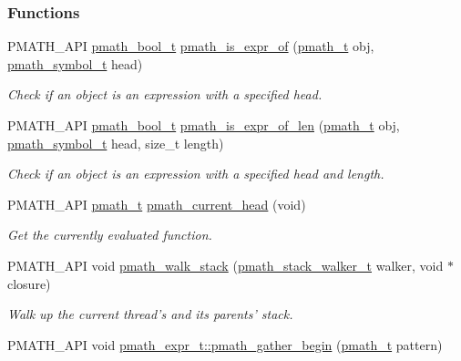 \subsubsection*{Functions}
\begin{CompactItemize}
\item 
PMATH\_\-API \hyperlink{group__general__types_gc92090cb0b56345d6c379ed2341d4ef4}{pmath\_\-bool\_\-t} \hyperlink{group__helpers_g66eb580a000ee1d778b43dec124f170d}{pmath\_\-is\_\-expr\_\-of} (\hyperlink{classpmath__t}{pmath\_\-t} obj, \hyperlink{classpmath__symbol__t}{pmath\_\-symbol\_\-t} head)
\begin{CompactList}\small\item\em Check if an object is an expression with a specified head. \item\end{CompactList}\item 
PMATH\_\-API \hyperlink{group__general__types_gc92090cb0b56345d6c379ed2341d4ef4}{pmath\_\-bool\_\-t} \hyperlink{group__helpers_g68d264fe6b3db0931b4d0a8d5c7427f5}{pmath\_\-is\_\-expr\_\-of\_\-len} (\hyperlink{classpmath__t}{pmath\_\-t} obj, \hyperlink{classpmath__symbol__t}{pmath\_\-symbol\_\-t} head, size\_\-t length)
\begin{CompactList}\small\item\em Check if an object is an expression with a specified head and length. \item\end{CompactList}\item 
PMATH\_\-API \hyperlink{classpmath__t}{pmath\_\-t} \hyperlink{group__helpers_g70aa270956b6c8f8eb43431f9775ae88}{pmath\_\-current\_\-head} (void)
\begin{CompactList}\small\item\em Get the currently evaluated function. \item\end{CompactList}\item 
PMATH\_\-API void \hyperlink{group__helpers_g55213cb0c89952b6aacf90f36ad4047b}{pmath\_\-walk\_\-stack} (\hyperlink{group__helpers_g11afc6451921f3169224096723483c64}{pmath\_\-stack\_\-walker\_\-t} walker, void $\ast$closure)
\begin{CompactList}\small\item\em Walk up the current thread's and its parents' stack. \item\end{CompactList}\item 
PMATH\_\-API void \hyperlink{group__helpers_g077f3730ca4275b87d9a35bce6013e45}{pmath\_\-expr\_\-t::pmath\_\-gather\_\-begin} (\hyperlink{classpmath__t}{pmath\_\-t} pattern)

\end{CompactItemize}
